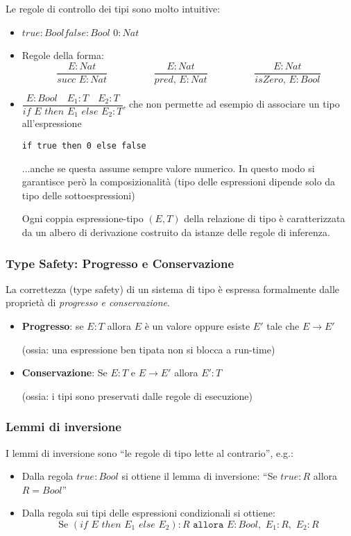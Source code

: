 \documentclass[a4paper,10pt]{article}
\begin{document}
Le regole di controllo dei tipi sono molto intuitive:
\begin{itemize}
 \item $true : Bool$\quad\quad $false : Bool$ \quad\quad$0 : Nat$
 \item Regole della forma:
 \[ \dfrac{E:Nat}{succ\,\,E : Nat} \hspace{2cm} \dfrac{E:Nat}{pred,\,E : Nat} \hspace{2cm} \dfrac{E:Nat}{isZero,\,E : Bool}\]
 \item $\dfrac{E : Bool\quad E_1 : T\quad E_2:T}{if\,\, E\,\, then\,\, E_1\,\, else\,\, E_2 : T}$, che non permette ad esempio di associare un tipo all'espressione
 \begin{center}
  \tt if true then 0 else false
 \end{center}
 
 ...anche se questa assume sempre valore numerico. In questo modo si garantisce però la composizionalità (tipo delle espressioni dipende solo da tipo delle sottoespressioni)\smallskip
 
 Ogni coppia espressione-tipo $(E, T)$ della relazione di tipo è caratterizzata da un albero di derivazione costruito da istanze delle regole di inferenza.
 \end{itemize}
 \subsubsection{Type Safety: Progresso e Conservazione}
 
 La correttezza (type safety) di un sistema di tipo è espressa formalmente dalle proprietà di \emph{progresso e conservazione}.
 
 \begin{itemize}
  \item \textbf{Progresso}: se $E:T$ allora $E$ è un valore oppure esiste $E'$ tale che $E \to E'$ 
  
  (ossia: una espressione ben tipata non si blocca a run-time)
  \item \textbf{Conservazione}: Se $E:T$ e $E \to E'$ allora $E' : T$ 
  
  (ossia: i tipi sono preservati dalle regole di esecuzione)
 \end{itemize}

    \subsubsection{Lemmi di inversione}
    I lemmi di inversione sono ``le regole di tipo lette al contrario'', e.g.:
    \begin{itemize}
     \item Dalla regola $true:Bool$ si ottiene il lemma di inversione: ``Se $true: R$ allora $R = Bool$''
    \item Dalla regola sui tipi delle espressioni condizionali si ottiene:
    \[\text{Se }(if\,\,E\,\,then\,\,E_1\,\,else\,\,E_2):R \texttt{ allora }E:Bool, \,\, E_1:R, \,\, E_2:R\]
    \end{itemize}
    
\end{document}
